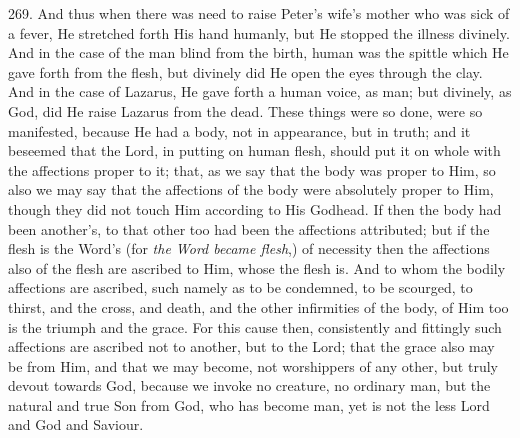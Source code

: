 269.
And thus when there was need to raise Peter's wife's mother who was
sick of a fever, He stretched forth His hand humanly, but He stopped
the illness divinely. And in the case of the man blind from the birth,
human was the spittle which He gave forth from the flesh, but divinely
did He open the eyes through the clay. And in the case of Lazarus, He
gave forth a human voice, as man; but divinely, as God, did He raise
Lazarus from the dead. These things were so done, were so manifested,
because He had a body, not in appearance, but in truth; and it
beseemed that the Lord, in putting on human flesh, should put it on
whole with the affections proper to it; that, as we say that the body
was proper to Him, so also we may say that the affections of the body
were absolutely proper to Him, though they did not touch Him according
to His Godhead. If then the body had been another's, to that other too
had been the affections attributed; but if the flesh is the Word's
(for \emph{the Word became flesh},) of necessity then the affections
also of the flesh are ascribed to Him, whose the flesh is. And to whom
the bodily affections are ascribed, such namely as to be condemned, to
be scourged, to thirst, and the cross, and death, and the other
infirmities of the body, of Him too is the triumph and the grace. For
this cause then, consistently and fittingly such affections are
ascribed not to another, but to the Lord; that the grace also may be
from Him, and that we may become, not worshippers of any other, but
truly devout towards God, because we invoke no creature, no ordinary
man, but the natural and true Son from God, who has become man, yet is
not the less Lord and God and Saviour.

